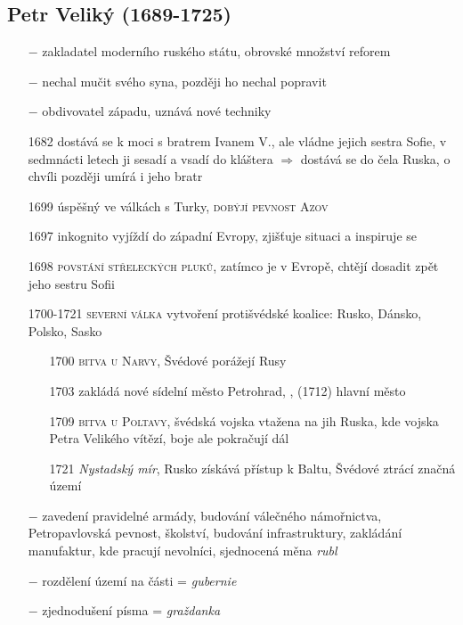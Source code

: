 \documentclass{article}
\begin{document}
\subsection*{Petr Veliký (1689-1725)}
\begin{itemize}
    \vspace{-0.5em}
    \setlength\itemsep{0.15em}
    \item[$-$] zakladatel moderního ruského státu, obrovské množství reforem
    \item[$-$] nechal mučit svého syna, později ho nechal popravit
    \item[$-$] obdivovatel západu, uznává nové techniky
    \item[1682] dostává se k moci s bratrem Ivanem V., ale vládne jejich sestra Sofie, v sedmnácti letech ji sesadí a vsadí do kláštera $\Rightarrow$ dostává se do čela Ruska, o chvíli později umírá i jeho bratr
    \item[1699] úspěšný ve válkách s Turky, \textsc{dobýjí pevnost Azov}
    \item[1697]  inkognito vyjíždí do západní Evropy, zjišťuje situaci a inspiruje se
    \item[1698] \textsc{povstání střeleckých pluků}, zatímco je v Evropě, chtějí dosadit zpět jeho sestru Sofii
    \item[1700-1721] \textsc{severní válka} vytvoření protišvédské koalice: Rusko, Dánsko, Polsko, Sasko
    \begin{itemize}
        \vspace{-0.5em}
        \setlength\itemsep{0.15em}
        \item[1700] \textsc{bitva u Narvy}, Švédové porážejí Rusy
        \item[1703] zakládá nové sídelní město Petrohrad, , (1712) hlavní město
        \item[1709]  \textsc{bitva u Poltavy}, švédská vojska vtažena na jih Ruska, kde vojska Petra Velikého vítězí, boje ale pokračují dál
        \item[1721] \textit{Nystadský mír}, Rusko získává přístup k Baltu,  Švédové ztrácí značná území
    \end{itemize}
    \item[$-$] zavedení pravidelné armády, budování válečného námořnictva, Petropavlovská pevnost, školství, budování infrastruktury, zakládání manufaktur, kde pracují nevolníci, sjednocená měna \textit{rubl}
    \item[$-$] rozdělení území na části = \textit{gubernie}
    \item[$-$] zjednodušení písma = \textit{graždanka}
\end{itemize}
\end{document}
